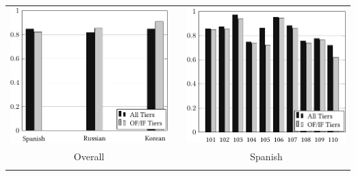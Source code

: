 \documentclass[a4paper]{article}
\begin{document}
\begin{tabular}[t]{ccc}
\includegraphics{kappa4.pdf} & \xspace & \includegraphics{kappa-spa.pdf} \\
Overall & & Spanish \\
\xspace & & \xspace \\

\end{tabular}
\end{document}
